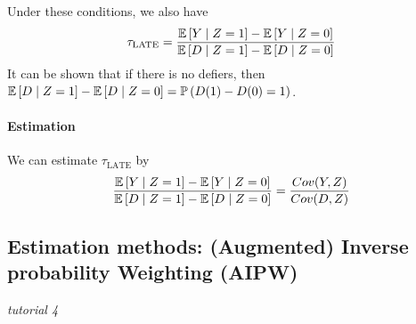 Under these conditions, we also have \begin{equation*}
    \tau_{\text{LATE}} = \frac{\mathbb{E}\left[Y \mid Z=1\right]-\mathbb{E}\left[Y\mid Z=0\right]}{\mathbb{E}\left[D\mid Z=1\right]-\mathbb{E}\left[D\mid Z=0\right]}
\end{equation*}
It can be shown that if there is no defiers, then $\mathbb{E}\left[D\mid Z=1\right]-\mathbb{E}\left[D\mid Z=0\right] = \mathbb{P}\left(D(1)-D(0)=1\right)$.

\paragraph{Estimation}
We can estimate $\tau_{\text{LATE}}$ by \begin{equation*}
    \frac{\mathbb{E}\left[Y \mid Z=1\right]-\mathbb{E}\left[Y\mid Z=0\right]}{\mathbb{E}\left[D\mid Z=1\right]-\mathbb{E}\left[D\mid Z=0\right]}=\frac{Cov(Y,Z)}{Cov(D,Z)}
\end{equation*}

\subsection{Estimation methods: (Augmented) Inverse probability Weighting (AIPW)}
\textit{tutorial 4}
